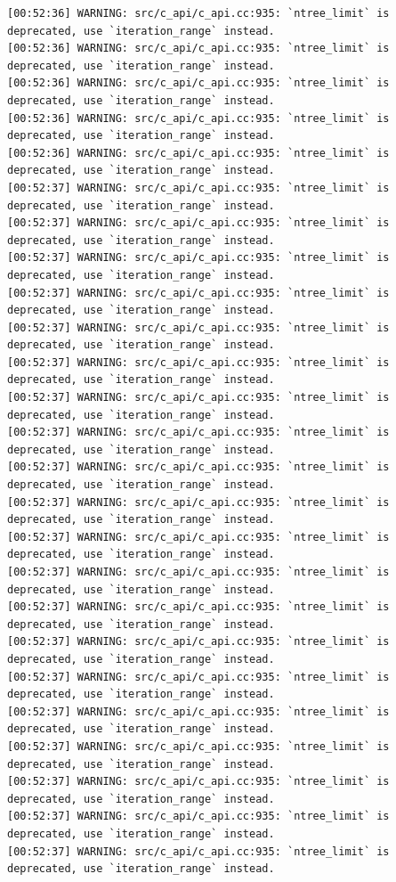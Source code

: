 \documentclass[
  letterpaper,
  DIV=11,
  numbers=noendperiod]{scrartcl}
\begin{document}
\begin{verbatim}
[00:52:36] WARNING: src/c_api/c_api.cc:935: `ntree_limit` is deprecated, use `iteration_range` instead.
[00:52:36] WARNING: src/c_api/c_api.cc:935: `ntree_limit` is deprecated, use `iteration_range` instead.
[00:52:36] WARNING: src/c_api/c_api.cc:935: `ntree_limit` is deprecated, use `iteration_range` instead.
[00:52:36] WARNING: src/c_api/c_api.cc:935: `ntree_limit` is deprecated, use `iteration_range` instead.
[00:52:36] WARNING: src/c_api/c_api.cc:935: `ntree_limit` is deprecated, use `iteration_range` instead.
[00:52:37] WARNING: src/c_api/c_api.cc:935: `ntree_limit` is deprecated, use `iteration_range` instead.
[00:52:37] WARNING: src/c_api/c_api.cc:935: `ntree_limit` is deprecated, use `iteration_range` instead.
[00:52:37] WARNING: src/c_api/c_api.cc:935: `ntree_limit` is deprecated, use `iteration_range` instead.
[00:52:37] WARNING: src/c_api/c_api.cc:935: `ntree_limit` is deprecated, use `iteration_range` instead.
[00:52:37] WARNING: src/c_api/c_api.cc:935: `ntree_limit` is deprecated, use `iteration_range` instead.
[00:52:37] WARNING: src/c_api/c_api.cc:935: `ntree_limit` is deprecated, use `iteration_range` instead.
[00:52:37] WARNING: src/c_api/c_api.cc:935: `ntree_limit` is deprecated, use `iteration_range` instead.
[00:52:37] WARNING: src/c_api/c_api.cc:935: `ntree_limit` is deprecated, use `iteration_range` instead.
[00:52:37] WARNING: src/c_api/c_api.cc:935: `ntree_limit` is deprecated, use `iteration_range` instead.
[00:52:37] WARNING: src/c_api/c_api.cc:935: `ntree_limit` is deprecated, use `iteration_range` instead.
[00:52:37] WARNING: src/c_api/c_api.cc:935: `ntree_limit` is deprecated, use `iteration_range` instead.
[00:52:37] WARNING: src/c_api/c_api.cc:935: `ntree_limit` is deprecated, use `iteration_range` instead.
[00:52:37] WARNING: src/c_api/c_api.cc:935: `ntree_limit` is deprecated, use `iteration_range` instead.
[00:52:37] WARNING: src/c_api/c_api.cc:935: `ntree_limit` is deprecated, use `iteration_range` instead.
[00:52:37] WARNING: src/c_api/c_api.cc:935: `ntree_limit` is deprecated, use `iteration_range` instead.
[00:52:37] WARNING: src/c_api/c_api.cc:935: `ntree_limit` is deprecated, use `iteration_range` instead.
[00:52:37] WARNING: src/c_api/c_api.cc:935: `ntree_limit` is deprecated, use `iteration_range` instead.
[00:52:37] WARNING: src/c_api/c_api.cc:935: `ntree_limit` is deprecated, use `iteration_range` instead.
[00:52:37] WARNING: src/c_api/c_api.cc:935: `ntree_limit` is deprecated, use `iteration_range` instead.
[00:52:37] WARNING: src/c_api/c_api.cc:935: `ntree_limit` is deprecated, use `iteration_range` instead.

\end{verbatim}
\end{document}
